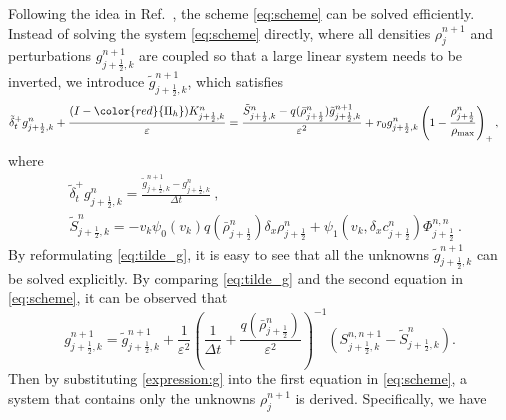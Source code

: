 \documentclass[review,onefignum,onetabnum]{siamart220329}
\newcommand {\e}  {\varepsilon}
\begin{document}
Following the idea in Ref.~\cite{LemouMieussens}, the scheme \cref{eq:scheme} can be solved efficiently. 
Instead of solving the system \cref{eq:scheme} directly, where all densities $\rho_{j}^{n+1}$ and perturbations $g_{j+\frac{1}{2},k}^{n+1}$ are coupled so that a large linear system needs to be inverted, 
we introduce $\tilde{g}_{j+\frac{1}{2},k}^{n+1}$, which satisfies 
\begin{align}     \label{eq:tilde_g}
    &\tilde{\delta}_t^+ g_{j+\frac12,k}^n + \frac{
	(I - {\color{red}{\Pi_h}})K_{j+\frac12,k}^n}{\e}
    = \frac{
	\tilde{S}_{j+\frac12,k}^{n} - q(\bar{\rho}_{j+\frac12}^n)\tilde{g}_{j+\frac12,k}^{n+1}}{\e^2} 
	+ r_0 g_{j+\frac12,k}^n\left(1 - \frac{\rho_{j+\frac12}^n}{\rho_{\rm max}}\right)_+,
\end{align}
where 
\begin{align*}
    & \tilde{\delta}_t^+ g_{j+\frac12,k}^n = \frac{\tilde{g}_{j+\frac12,k}^{n+1} - g_{j+\frac12,k}^n}{\Delta t}  \ , \\
    &\tilde{S}_{j+\frac12,k}^{n} =  
	- v_k \psi_{0}(v_k)  	q(\bar{\rho}_{j+\frac12}^n)\delta_x\rho_{j+\frac12}^{n}
	+ \psi_{1}(v_k,\delta_x c_{j+\frac12}^n)\Phi^{n,n}_{j+\frac12}\ .
\end{align*}
By reformulating \cref{eq:tilde_g}, it is easy to see that 
all the unknowns $\tilde{g}_{j+\frac{1}{2},k}^{n+1}$ can be solved explicitly.  
By comparing \cref{eq:tilde_g} and the second equation in \cref{eq:scheme}, it can be observed that 
\begin{equation}  \label{expression:g}
    g_{j+\frac12,k}^{n+1} 
    =   \tilde{g}_{j+\frac12,k}^{n+1} 
    + \frac{1}{\varepsilon^2}\left(\frac{1}{\Delta t} +  \frac{q(\bar{\rho}_{j+\frac12}^n)}{\varepsilon^2}\right)^{-1}(S_{j+\frac12,k}^{n, n+1} - \tilde{S}_{j+\frac12,k}^{n}).
\end{equation}
Then by substituting \cref{expression:g} into the first equation in  \cref{eq:scheme}, a system that contains only the unknowns $\rho_j^{n+1}$ is derived. 
Specifically, we have 
\end{document}
